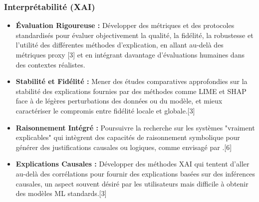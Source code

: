 \documentclass[11pt,a4paper]{article}
\begin{document}
\subsubsection{Interprétabilité (XAI)}
\begin{itemize}
    \item \textbf{Évaluation Rigoureuse :} Développer des métriques et des protocoles standardisés pour évaluer objectivement la qualité, la fidélité, la robustesse et l'utilité des différentes méthodes d'explication, en allant au-delà des métriques proxy [3] et en intégrant davantage d'évaluations humaines dans des contextes réalistes.
    \item \textbf{Stabilité et Fidélité :} Mener des études comparatives approfondies sur la stabilité des explications fournies par des méthodes comme LIME et SHAP face à de légères perturbations des données ou du modèle, et mieux caractériser le compromis entre fidélité locale et globale.[3]
    \item \textbf{Raisonnement Intégré :} Poursuivre la recherche sur les systèmes "vraiment explicables" qui intègrent des capacités de raisonnement symbolique pour générer des justifications causales ou logiques, comme envisagé par \citet{Doran2017}.[6]
    \item \textbf{Explications Causales :} Développer des méthodes XAI qui tentent d'aller au-delà des corrélations pour fournir des explications basées sur des inférences causales, un aspect souvent désiré par les utilisateurs mais difficile à obtenir des modèles ML standards.[3]
\end{itemize}
\end{document}
